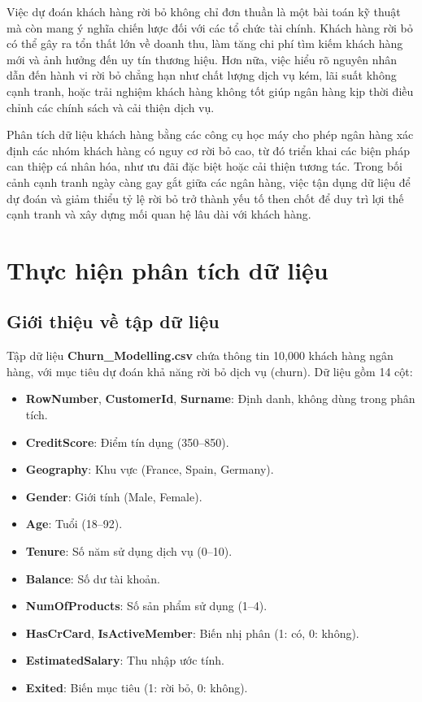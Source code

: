 \documentclass[
]{article}
\providecommand{\tightlist}{%
  \setlength{\itemsep}{0pt}\setlength{\parskip}{0pt}}
\begin{document}
Việc dự đoán khách hàng rời bỏ không chỉ đơn thuần là một bài toán kỹ
thuật mà còn mang ý nghĩa chiến lược đối với các tổ chức tài chính.
Khách hàng rời bỏ có thể gây ra tổn thất lớn về doanh thu, làm tăng chi
phí tìm kiếm khách hàng mới và ảnh hưởng đến uy tín thương hiệu. Hơn
nữa, việc hiểu rõ nguyên nhân dẫn đến hành vi rời bỏ chẳng hạn như chất
lượng dịch vụ kém, lãi suất không cạnh tranh, hoặc trải nghiệm khách
hàng không tốt giúp ngân hàng kịp thời điều chỉnh các chính sách và cải
thiện dịch vụ.

Phân tích dữ liệu khách hàng bằng các công cụ học máy cho phép ngân hàng
xác định các nhóm khách hàng có nguy cơ rời bỏ cao, từ đó triển khai các
biện pháp can thiệp cá nhân hóa, như ưu đãi đặc biệt hoặc cải thiện
tương tác. Trong bối cảnh cạnh tranh ngày càng gay gắt giữa các ngân
hàng, việc tận dụng dữ liệu để dự đoán và giảm thiểu tỷ lệ rời bỏ trở
thành yếu tố then chốt để duy trì lợi thế cạnh tranh và xây dựng mối
quan hệ lâu dài với khách hàng.

\section{Thực hiện phân tích dữ liệu}\label{sec-analysis}

\subsection{Giới thiệu về tập dữ liệu}\label{sec-dataset}

Tập dữ liệu \textbf{Churn\_Modelling.csv} chứa thông tin 10,000 khách
hàng ngân hàng, với mục tiêu dự đoán khả năng rời bỏ dịch vụ (churn). Dữ
liệu gồm 14 cột:

\begin{itemize}
\tightlist
\item
  \textbf{RowNumber}, \textbf{CustomerId}, \textbf{Surname}: Định danh,
  không dùng trong phân tích.
\item
  \textbf{CreditScore}: Điểm tín dụng (350--850).
\item
  \textbf{Geography}: Khu vực (France, Spain, Germany).
\item
  \textbf{Gender}: Giới tính (Male, Female).
\item
  \textbf{Age}: Tuổi (18--92).
\item
  \textbf{Tenure}: Số năm sử dụng dịch vụ (0--10).
\item
  \textbf{Balance}: Số dư tài khoản.
\item
  \textbf{NumOfProducts}: Số sản phẩm sử dụng (1--4).
\item
  \textbf{HasCrCard}, \textbf{IsActiveMember}: Biến nhị phân (1: có, 0:
  không).
\item
  \textbf{EstimatedSalary}: Thu nhập ước tính.
\item
  \textbf{Exited}: Biến mục tiêu (1: rời bỏ, 0: không).
\end{itemize}
\end{document}
